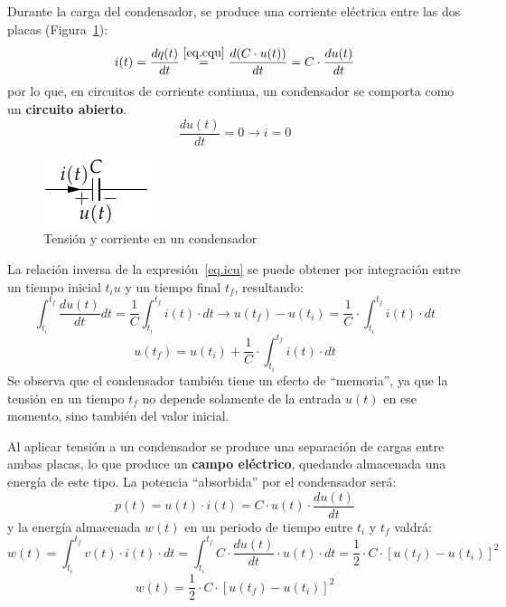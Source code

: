 \documentclass[11pt]{book} %
\numberwithin{dummy}{section}
\theoremstyle{ocrenumbox}
\theoremstyle{blacknumex}
\theoremstyle{blacknumbox}
\theoremstyle{ocrenum}
\begin{document}
	Durante la carga del condensador, se produce una corriente eléctrica entre las dos placas (Figura~\ref{fig.condensador}): 
	\begin{equation*}\label{eq.icu}
		i(t)=\dfrac{dq(t)}{dt}\stackrel{\eqref{eq.cqu}}{=}\dfrac{d(C\cdot u(t))}{dt}=C\cdot \dfrac{du(t)}{dt}
	\end{equation*}
	por lo que, en circuitos de corriente continua, un condensador se comporta como un \textbf{circuito abierto}.
	\begin{equation*}
		\frac{du(t)}{dt} = 0 \rightarrow i = 0
	\end{equation*}
	\begin{figure}[htbp]
		\centering
		\includegraphics[width=0.15\linewidth]{../figs/Condensador.pdf}
		\caption{Tensión y corriente en un condensador}
		\label{fig.condensador}
	\end{figure}
	
	La relación inversa de la expresión~\eqref{eq.icu} se puede obtener por integración entre un tiempo inicial $t_iu$ y un tiempo final $t_f$, resultando:
	\begin{equation*}
		\int_{t_i}^{t_f} \dfrac{du(t)}{dt}dt=\dfrac{1}{C}\int_{t_i}^{t_f}i(t)\cdot dt \rightarrow u(t_f)-u(t_i)=\dfrac{1}{C}\cdot\int_{t_i}^{t_f} i(t)\cdot dt
	\end{equation*}
	\begin{equation}\label{eq.u_C}
		\boxed{u(t_f)=u(t_i)+\dfrac{1}{C}\cdot\int_{t_i}^{t_f} i(t)\cdot dt}
	\end{equation}
	Se observa que el condensador también tiene un efecto de ``memoria'', ya que la tensión en un tiempo $t_f$ no depende solamente de la entrada $u(t)$ en ese momento, sino también del valor inicial.
	
	Al aplicar tensión a un condensador se produce una separación de cargas entre ambas placas, lo que produce un \textbf{campo eléctrico}, quedando almacenada una energía de este tipo. La potencia ``absorbida'' por el condensador será:
	\begin{equation*}
		p(t)=u(t)\cdot i(t)=C\cdot u(t)\cdot\dfrac{du(t)}{dt}
	\end{equation*}
	y la energía almacenada $w(t)$ en un periodo de tiempo entre $t_i$ y $t_f$ valdrá:
	\begin{equation*}
		w(t)=\int_{t_i}^{t_f}v(t)\cdot i(t)\cdot dt=\int_{t_i}^{t_f}C\cdot\dfrac{du(t)}{dt}\cdot u(t)\cdot dt=\dfrac{1}{2}\cdot C\cdot [u(t_f)-u(t_i)]^2
	\end{equation*}
	\begin{equation}
		\boxed{w(t)=\dfrac{1}{2}\cdot C\cdot [u(t_f)-u(t_i)]^2}
	\end{equation}
	
\end{document}
